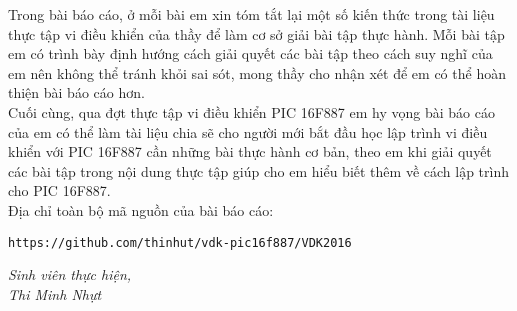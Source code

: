 Trong bài báo cáo, ở mỗi bài em xin tóm tắt lại một số kiến thức trong tài liệu thực tập vi điều khiển của thầy để làm cơ sở giải bài tập thực hành. Mỗi bài tập em có trình bày định hướng cách giải quyết các bài tập theo cách suy nghĩ của em nên không thể tránh khỏi sai sót, mong thầy cho nhận xét để em có thể hoàn thiện bài báo cáo hơn.\\

Cuối cùng, qua đợt thực tập vi điều khiển PIC 16F887 em hy vọng bài báo cáo của em có thể làm tài liệu chia sẽ cho người mới bắt đầu học lập trình vi điều khiển với PIC 16F887 cần những bài thực hành cơ bản, theo em khi giải quyết các bài tập trong nội dung thực tập giúp cho em hiểu biết thêm về cách lập trình cho PIC 16F887.\\

Địa chỉ toàn bộ mã nguồn của bài báo cáo:
\begin{center}
\verb|https://github.com/thinhut/vdk-pic16f887/VDK2016|
\end{center}
\begin{flushright}
\textit{Sinh viên thực hiện,}\vspace{.5cm}\\
\textit{Thi Minh Nhựt}
\end{flushright}